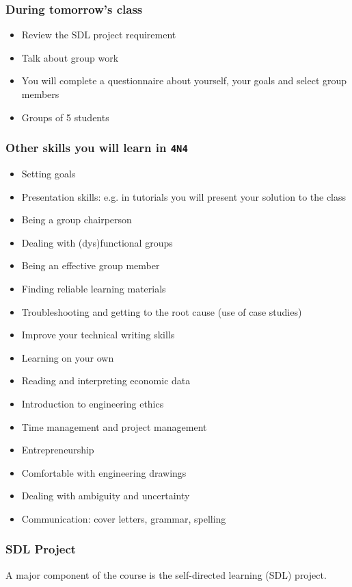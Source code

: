 \begin{frame}\frametitle{During tomorrow's class}
	\begin{itemize}
		\item	Review the SDL project requirement
		\item	Talk about group work
		\item	You will complete a questionnaire about yourself, your goals and select group members
		\item	Groups of 5 students
	\end{itemize}
\end{frame}

\begin{frame}\frametitle{Other skills you will learn in \texttt{4N4}}
	\begin{itemize}
		\item	Setting goals
		\item	Presentation skills: e.g. in tutorials you will present your solution to the class
		\item	Being a group chairperson
		\item	Dealing with (dys)functional groups
		\item	Being an effective group member
		\item	Finding reliable learning materials
		\item	Troubleshooting and getting to the root cause {\scriptsize (use of case studies)}
		\item	Improve your technical writing skills
		\item	Learning on your own
		\item	Reading and interpreting economic data
		\item	Introduction to engineering ethics
		\item	Time management and project management
		\item	Entrepreneurship
		\item	Comfortable with engineering drawings
		\item	Dealing with ambiguity and uncertainty		
		\item	Communication: cover letters, grammar, spelling
	\end{itemize}	
\end{frame}

\begin{frame}\frametitle{SDL Project}
	A major component of the course is the self-directed learning (SDL) project.
\end{frame}

